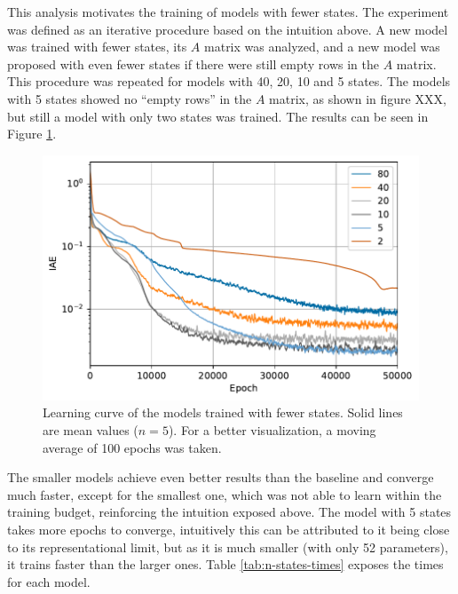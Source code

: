This analysis motivates the training of models with fewer states.
The experiment was defined as an iterative procedure based on the intuition above.
A new model was trained with fewer states, its $A$ matrix was analyzed, and a new model was proposed with even fewer states if there were still empty rows in the $A$ matrix.
This procedure was repeated for models with 40, 20, 10 and 5 states.
The models with 5 states showed no ``empty rows'' in the $A$ matrix, as shown in figure XXX, but still a model with only two states was trained.  %
The results can be seen in Figure \ref{fig:states-iae}.

\begin{figure}[h]
    \centering
    \includegraphics{images/exp_2_iae.pdf}
    \caption{Learning curve of the models trained with fewer states. Solid lines are mean values ($n=5$). For a better visualization, a moving average of 100 epochs was taken.}
    \label{fig:states-iae}
\end{figure}

The smaller models achieve even better results than the baseline and converge much faster, except for the smallest one, which was not able to learn within the training budget, reinforcing the intuition exposed above.
The model with 5 states takes more epochs to converge, intuitively this can be attributed to it being close to its representational limit, but as it is much smaller (with only 52 parameters), it trains faster than the larger ones.
Table \ref{tab:n-states-times} exposes the times for each model.

